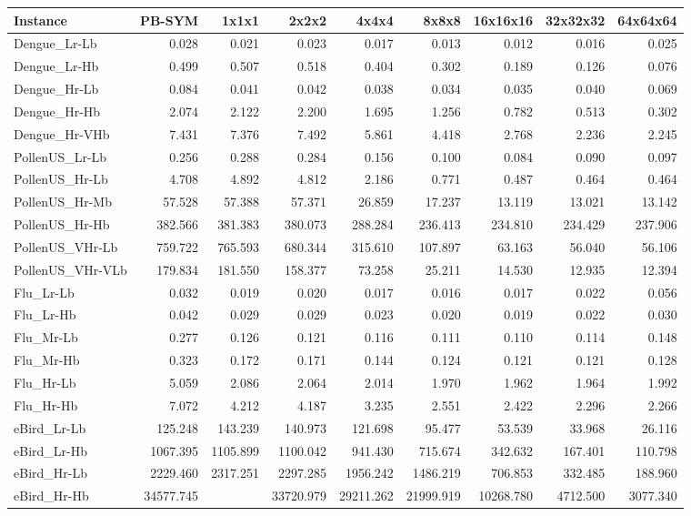 \begin{tabular}{|l|r|rrrrrrr|}
\hline
Instance & PB-SYM  & 1x1x1  & 2x2x2  & 4x4x4  & 8x8x8  & 16x16x16  & 32x32x32  & 64x64x64  \\
\hline
Dengue\_Lr-Lb & 0.028  & 0.021  & 0.023  & 0.017  & 0.013  & 0.012  & 0.016  & 0.025  \\
Dengue\_Lr-Hb & 0.499  & 0.507  & 0.518  & 0.404  & 0.302  & 0.189  & 0.126  & 0.076  \\
Dengue\_Hr-Lb & 0.084  & 0.041  & 0.042  & 0.038  & 0.034  & 0.035  & 0.040  & 0.069  \\
Dengue\_Hr-Hb & 2.074  & 2.122  & 2.200  & 1.695  & 1.256  & 0.782  & 0.513  & 0.302  \\
Dengue\_Hr-VHb & 7.431  & 7.376  & 7.492  & 5.861  & 4.418  & 2.768  & 2.236  & 2.245  \\
PollenUS\_Lr-Lb & 0.256  & 0.288  & 0.284  & 0.156  & 0.100  & 0.084  & 0.090  & 0.097  \\
PollenUS\_Hr-Lb & 4.708  & 4.892  & 4.812  & 2.186  & 0.771  & 0.487  & 0.464  & 0.464  \\
PollenUS\_Hr-Mb & 57.528  & 57.388  & 57.371  & 26.859  & 17.237  & 13.119  & 13.021  & 13.142  \\
PollenUS\_Hr-Hb & 382.566  & 381.383  & 380.073  & 288.284  & 236.413  & 234.810  & 234.429  & 237.906  \\
PollenUS\_VHr-Lb & 759.722  & 765.593  & 680.344  & 315.610  & 107.897  & 63.163  & 56.040  & 56.106  \\
PollenUS\_VHr-VLb & 179.834  & 181.550  & 158.377  & 73.258  & 25.211  & 14.530  & 12.935  & 12.394  \\
Flu\_Lr-Lb & 0.032  & 0.019  & 0.020  & 0.017  & 0.016  & 0.017  & 0.022  & 0.056  \\
Flu\_Lr-Hb & 0.042  & 0.029  & 0.029  & 0.023  & 0.020  & 0.019  & 0.022  & 0.030  \\
Flu\_Mr-Lb & 0.277  & 0.126  & 0.121  & 0.116  & 0.111  & 0.110  & 0.114  & 0.148  \\
Flu\_Mr-Hb & 0.323  & 0.172  & 0.171  & 0.144  & 0.124  & 0.121  & 0.121  & 0.128  \\
Flu\_Hr-Lb & 5.059  & 2.086  & 2.064  & 2.014  & 1.970  & 1.962  & 1.964  & 1.992  \\
Flu\_Hr-Hb & 7.072  & 4.212  & 4.187  & 3.235  & 2.551  & 2.422  & 2.296  & 2.266  \\
eBird\_Lr-Lb & 125.248  & 143.239  & 140.973  & 121.698  & 95.477  & 53.539  & 33.968  & 26.116  \\
eBird\_Lr-Hb & 1067.395  & 1105.899  & 1100.042  & 941.430  & 715.674  & 342.632  & 167.401  & 110.798  \\
eBird\_Hr-Lb & 2229.460  & 2317.251  & 2297.285  & 1956.242  & 1486.219  & 706.853  & 332.485  & 188.960  \\
eBird\_Hr-Hb & 34577.745  &  & 33720.979  & 29211.262  & 21999.919  & 10268.780  & 4712.500  & 3077.340  \\
\hline
\end{tabular}
